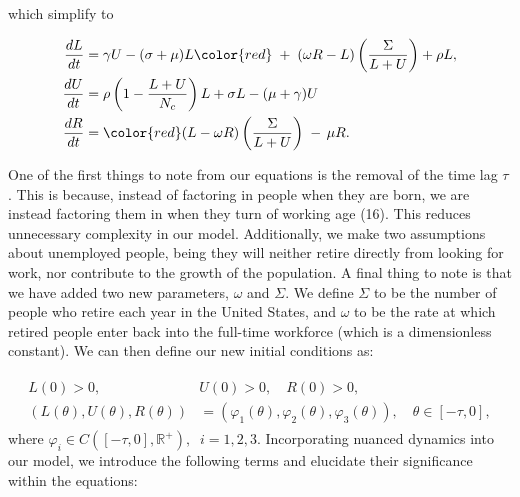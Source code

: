 \documentclass[11pt]{amsart}
\begin{document}
which simplify to 

\begin{align}
    \begin{split}
        \frac{dL}{dt} &= \gamma U - (\sigma + \mu)L {\color{red}\; + \;(\omega R - L)\left(\frac{\Sigma}{L + U}\right) + \rho L},\\
        \frac{dU}{dt} &= \rho\left(1 - \frac{L + U}{N_c} \right)L + \sigma L -(\mu + \gamma)U  \\
        \frac{dR}{dt} &= {\color{red}(L - \omega R)\left(\frac{\Sigma}{L + U}\right) \; - \, \mu R}.
    \end{split}
\end{align}

One of the first things to note from our equations is the removal of the time lag $\tau$. 
This is because, instead of factoring in people when they are born, we are instead factoring them
in when they turn of working age (16). This reduces unnecessary complexity in our model. Additionally, we make two assumptions about unemployed people, being they will
neither retire directly from looking for work, nor contribute to the growth of the population. A final thing to note
is that we have added two new parameters, $\omega$ and $\Sigma$. We define $\Sigma$ to be the number of people who
retire each year in the United States, and $\omega$ to be the rate at which retired people enter back
into the full-time workforce (which is a dimensionless constant). We can then define our new initial conditions as:

\begin{align}
    \begin{split}
        L(0) > 0, \quad &U(0) > 0, \quad R(0) > 0, \\
        (L(\theta),U(\theta), R(\theta)) &= (\varphi_1(\theta), \varphi_2(\theta), \varphi_3(\theta)), \quad \theta \in [-\tau,0],
    \end{split}
\end{align}
where $\varphi_i\in C([-\tau, 0], \mathbb{R}^+),\;\; i=1,2,3$. Incorporating nuanced dynamics into our model, we introduce the following terms and elucidate their significance within the equations:

\end{document}
